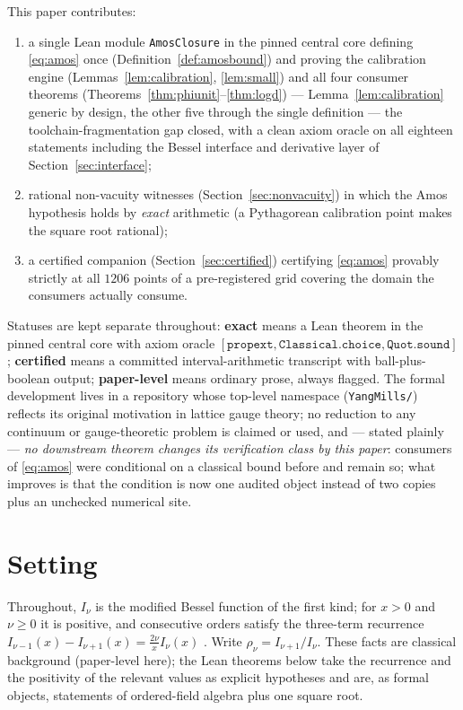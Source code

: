 \documentclass[11pt]{article}
\newcommand{\lean}[1]{\texttt{#1}}
\begin{document}
This paper contributes:
\begin{enumerate}
\item a single Lean module \lean{AmosClosure} in the pinned central
  core defining \eqref{eq:amos} once
  (Definition~\ref{def:amosbound}) and proving the calibration
  engine (Lemmas~\ref{lem:calibration}, \ref{lem:small}) and all
  four consumer theorems (Theorems~\ref{thm:phiunit}--\ref{thm:logd})
  --- Lemma~\ref{lem:calibration} generic by design, the other five
  through the single definition --- the toolchain-fragmentation gap
  closed, with a clean axiom oracle on all eighteen statements
  including the Bessel interface and derivative layer of
  Section~\ref{sec:interface};
\item rational non-vacuity witnesses (Section~\ref{sec:nonvacuity})
  in which the Amos hypothesis holds by \emph{exact} arithmetic
  (a Pythagorean calibration point makes the square root rational);
\item a certified companion (Section~\ref{sec:certified}) certifying
  \eqref{eq:amos} provably strictly at all $1206$ points of a
  pre-registered grid covering the domain the consumers actually
  consume.
\end{enumerate}
Statuses are kept separate throughout: \textbf{exact} means a Lean
theorem in the pinned central core with axiom oracle
$[\lean{propext}, \lean{Classical.choice}, \lean{Quot.sound}]$;
\textbf{certified} means a committed interval-arithmetic transcript
with ball-plus-boolean output; \textbf{paper-level} means ordinary
prose, always flagged.  The formal development lives in a repository
whose top-level namespace (\lean{YangMills/}) reflects its original
motivation in lattice gauge theory; no reduction to any continuum or
gauge-theoretic problem is claimed or used, and --- stated plainly
--- \emph{no downstream theorem changes its verification class by
this paper}: consumers of \eqref{eq:amos} were conditional on a
classical bound before and remain so; what improves is that the
condition is now one audited object instead of two copies plus an unchecked numerical site.

\section{Setting}\label{sec:setting}

Throughout, $I_\nu$ is the modified Bessel function of the first
kind; for $x > 0$ and $\nu \ge 0$ it is positive, and consecutive
orders satisfy the three-term recurrence
$I_{\nu-1}(x) - I_{\nu+1}(x) = \tfrac{2\nu}{x} I_\nu(x)$
\cite[10.29.1]{DLMF}.  Write $\rho_\nu = I_{\nu+1}/I_\nu$.  These
facts are classical background (paper-level here); the Lean theorems
below take the recurrence and the positivity of the relevant values
as explicit hypotheses and are, as formal objects, statements of
ordered-field algebra plus one square root.
\end{document}
